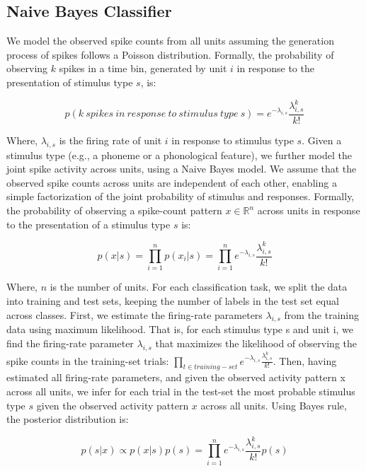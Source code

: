 \subsection{Naive Bayes Classifier}
We model the observed spike counts from all units assuming the generation process of spikes follows a Poisson distribution. Formally, the probability of observing $k$ spikes in a time bin, generated by unit $i$ in response to the presentation of stimulus type $s$, is:

\begin{equation}
    p(k \  spikes \ in  \  response  \  to  \  stimulus  \  type \  s)=e^{-\lambda_{i,s}}\frac{\lambda_{i,s}^k}{k!}
\end{equation}

Where, $\lambda_{i,s}$ is the firing rate of unit $i$ in response to stimulus type $s$. Given a stimulus type (e.g., a phoneme or a phonological feature), we further model the joint spike activity across units, using a Naive Bayes model. We assume that the observed spike counts across units are independent of each other, enabling a simple factorization of the joint probability of stimulus and responses. Formally, the probability of observing a spike-count pattern $x \in \mathbb{R}^n$ across units in response to the presentation of a stimulus type $s$ is:

\begin{equation}
    p(x|s)=\prod_{i=1}^n{p(x_i |s)}=\prod_{i=1}^n{e^{-\lambda_{i,s}}\frac{\lambda_{i,s}^k}{k!}}
\end{equation}

Where, $n$ is the number of units. For each classification task, we split the data into training and test sets, keeping the number of labels in the test set equal across classes. First, we estimate the firing-rate parameters $\lambda_{i,s}$ from the training data using maximum likelihood. That is, for each stimulus type s and unit i, we find the firing-rate parameter $\lambda_{i,s}$ that maximizes the likelihood of observing the spike counts in the training-set trials: $\prod_{t \in training-set}{e^{-\lambda_{i,s}}\frac{\lambda_{i,s}^k}{k!}}$. Then, having estimated all firing-rate parameters, and given the observed activity pattern x across all units, we infer for each trial in the test-set the most probable stimulus type $s$ given the observed activity pattern $x$ across all units. Using Bayes rule, the posterior distribution is:

\begin{equation}
    p(s|x) \propto p(x|s)p(s) = \prod_{i=1}^n{e^{-\lambda_{i,s}}\frac{\lambda_{i,s}^k}{k!}p(s)}
\end{equation}

